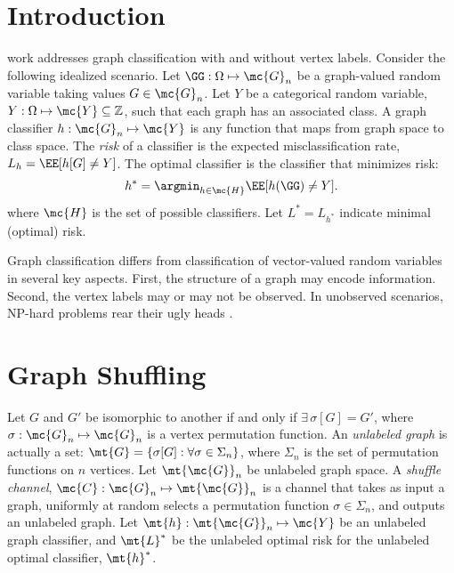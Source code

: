 \documentclass[10pt,journal,cspaper,compsoc]{IEEEtran}
\begin{document}
\maketitle
\IEEEdisplaynotcompsoctitleabstractindextext
\IEEEpeerreviewmaketitle



\section{Introduction}

  work addresses graph classification with and without vertex labels.  Consider the following idealized scenario. Let $\GG: \Omega \mapsto \mc{G}_n$ be a graph-valued random variable taking values $G\in \mc{G}_n$. 
Let $Y$ be a categorical random variable, $Y: \Omega \mapsto \mc{Y} \subseteq \mathbb{Z}$, such that each graph has an associated class.  A graph classifier $h: \mc{G}_n \mapsto \mc{Y}$ is any function that maps from graph space to class space.  The \emph{risk} of a classifier is the expected misclassification rate, $L_h=\EE[h[G]\neq Y]$.  The optimal classifier is the classifier that minimizes risk:
\begin{align}
	h^* = \argmin_{h \in \mc{H}} \EE[h(\GG) \neq Y].
\end{align}
where $\mc{H}$ is the set of possible classifiers.  Let $L^*=L_{h^*}$ indicate minimal (optimal) risk.  

Graph classification differs from classification of vector-valued random variables in several key aspects.  First, the structure of a graph may encode information.  Second, the vertex labels may or may not be observed.  In unobserved scenarios, NP-hard problems rear their ugly heads \cite{Conte2004}.

\section{Graph Shuffling} %
\label{sec:graph_shuffling}


Let $G$ and $G'$ be isomorphic to another if and only if $\exists \, \sigma[G]=G'$, where  $\sigma: \mc{G}_n \mapsto \mc{G}_n$ is a vertex permutation function.   An \emph{unlabeled graph} is actually a set: $\mt{G}=\{\sigma[G]: \forall \sigma \in \Sigma_n\}$, where $\Sigma_n$ is the set of permutation functions on $n$ vertices. Let $\mt{\mc{G}}_n$ be unlabeled graph space. A \emph{shuffle channel}, $\mc{C}: \mc{G}_n \mapsto \mt{\mc{G}}_n$ is a channel that takes as input a graph, uniformly at random selects a permutation function $\sigma \in \Sigma_n$, and outputs an unlabeled graph.  Let $\mt{h}: \mt{\mc{G}}_n \mapsto \mc{Y}$ be an unlabeled graph classifier, and $\mt{L}^*$ be the unlabeled optimal risk for the unlabeled optimal classifier, $\mt{h}^*$. %
\end{document}
